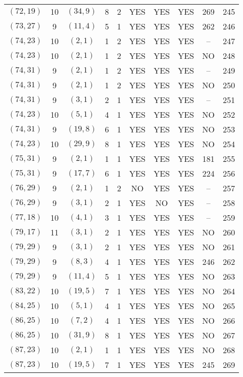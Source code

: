 \begin{longtable}{|c|c|c|c|c|c|c|c|c|c|}
$(72, 19)$ & 10 & $(34, 9)$ & 8 & 2 & YES & YES & YES & 269 & 245\\
$(73, 27)$ & 9 & $(11, 4)$ & 5 & 1 & YES & YES & YES & 262 & 246\\
$(74, 23)$ & 10 & $(2, 1)$ & 1 & 2 & YES & YES & YES & -- & 247\\
$(74, 23)$ & 10 & $(2, 1)$ & 1 & 2 & YES & YES & YES & NO & 248\\
$(74, 31)$ & 9 & $(2, 1)$ & 1 & 2 & YES & YES & YES & -- & 249\\
$(74, 31)$ & 9 & $(2, 1)$ & 1 & 2 & YES & YES & YES & NO & 250\\
$(74, 31)$ & 9 & $(3, 1)$ & 2 & 1 & YES & YES & YES & -- & 251\\
$(74, 23)$ & 10 & $(5, 1)$ & 4 & 1 & YES & YES & YES & NO & 252\\
$(74, 31)$ & 9 & $(19, 8)$ & 6 & 1 & YES & YES & YES & NO & 253\\
$(74, 23)$ & 10 & $(29, 9)$ & 8 & 1 & YES & YES & YES & NO & 254\\
$(75, 31)$ & 9 & $(2, 1)$ & 1 & 1 & YES & YES & YES & 181 & 255\\
$(75, 31)$ & 9 & $(17, 7)$ & 6 & 1 & YES & YES & YES & 224 & 256\\
$(76, 29)$ & 9 & $(2, 1)$ & 1 & 2 & NO & YES & YES & -- & 257\\
$(76, 29)$ & 9 & $(3, 1)$ & 2 & 1 & YES & NO & YES & -- & 258\\
$(77, 18)$ & 10 & $(4, 1)$ & 3 & 1 & YES & YES & YES & -- & 259\\
$(79, 17)$ & 11 & $(3, 1)$ & 2 & 1 & YES & YES & YES & NO & 260\\
$(79, 29)$ & 9 & $(3, 1)$ & 2 & 1 & YES & YES & YES & NO & 261\\
$(79, 29)$ & 9 & $(8, 3)$ & 4 & 1 & YES & YES & YES & 246 & 262\\
$(79, 29)$ & 9 & $(11, 4)$ & 5 & 1 & YES & YES & YES & NO & 263\\
$(83, 22)$ & 10 & $(19, 5)$ & 7 & 1 & YES & YES & YES & NO & 264\\
$(84, 25)$ & 10 & $(5, 1)$ & 4 & 1 & YES & YES & YES & NO & 265\\
$(86, 25)$ & 10 & $(7, 2)$ & 4 & 1 & YES & YES & YES & NO & 266\\
$(86, 25)$ & 10 & $(31, 9)$ & 8 & 1 & YES & YES & YES & NO & 267\\
$(87, 23)$ & 10 & $(2, 1)$ & 1 & 1 & YES & YES & YES & NO & 268\\
$(87, 23)$ & 10 & $(19, 5)$ & 7 & 1 & YES & YES & YES & 245 & 269\\

\end{longtable}
